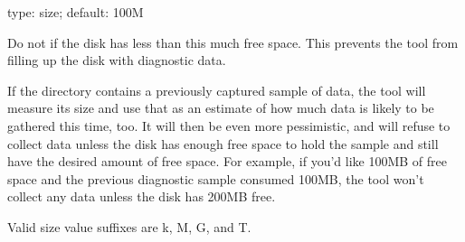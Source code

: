 \documentclass[letterpaper,10pt,english]{sphinxmanual}
\begin{document}
\begin{fulllineitems}
\label{\detokenize{mariadb-stat:cmdoption-mariadb-stat-disk-bytes-free}}
\sphinxAtStartPar
type: size; default: 100M

\sphinxAtStartPar
Do not {\hyperref[\detokenize{mariadb-stat:cmdoption-mariadb-stat-collect}]{}} if the disk has less than this much free space.
This prevents the tool from filling up the disk with diagnostic data.

\sphinxAtStartPar
If the {\hyperref[\detokenize{mariadb-stat:cmdoption-mariadb-stat-dest}]{}} directory contains a previously captured sample of data,
the tool will measure its size and use that as an estimate of how much data is
likely to be gathered this time, too.  It will then be even more pessimistic,
and will refuse to collect data unless the disk has enough free space to hold
the sample and still have the desired amount of free space.  For example, if
you’d like 100MB of free space and the previous diagnostic sample consumed
100MB, the tool won’t collect any data unless the disk has 200MB free.

\sphinxAtStartPar
Valid size value suffixes are k, M, G, and T.

\end{fulllineitems}

\end{document}
